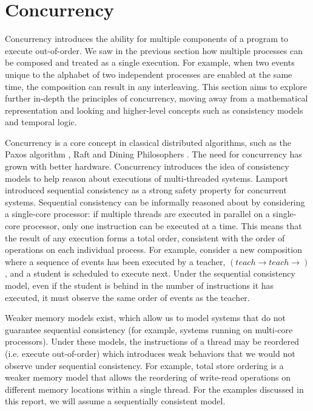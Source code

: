 \section{Concurrency}
Concurrency introduces the ability for multiple components of a program to execute out-of-order. We saw in the previous section how multiple processes can be composed and treated as a single execution. For example, when two events unique to the alphabet of two independent processes are enabled at the same time, the composition can result in any interleaving. This section aims to explore further in-depth the principles of concurrency, moving away from a mathematical representation and looking and higher-level concepts such as consistency models and temporal logic. 
\par
Concurrency is a core concept in classical distributed algorithms, such as the Paxos algorithm \cite{paxos}, Raft \cite{Raft} and Dining Philosophers \cite{dining_philosophers}. The need for concurrency has grown with better hardware. Concurrency introduces the idea of consistency models \cite{art_of_multiprocessor_programming} to help reason about executions of multi-threaded systems. Lamport introduced sequential consistency \cite{sc} as a strong safety property for concurrent systems. Sequential consistency can be informally reasoned about by considering a single-core processor: if multiple threads are executed in parallel on a single-core processor, only one instruction can be executed at a time. This means that the result of any execution forms a total order, consistent with the order of operations on each individual process. For example, consider a new composition where a sequence of events has been executed by a teacher, \((teach \rightarrow teach \rightarrow)\), and a student is scheduled to execute next. Under the sequential consistency model, even if the student is behind in the number of instructions it has executed, it must observe the same order of events as the teacher.
\par
Weaker memory models exist, which allow us to model systems that do not guarantee sequential consistency (for example, systems running on multi-core processors). Under these models, the instructions of a thread may be reordered (i.e. execute out-of-order) which introduces weak behaviors that we would not observe under sequential consistency. For example, total store ordering is a weaker memory model that allows the reordering of write-read operations on different memory locations within a single thread. For the examples discussed in this report, we will assume a sequentially consistent model.
